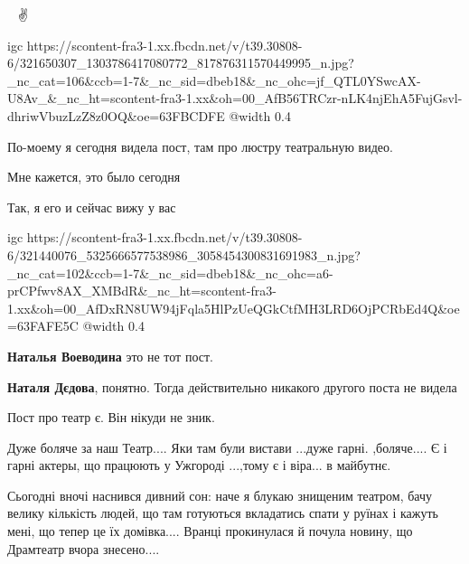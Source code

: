  
 
 
 
 


💖🙌🙏✌

\ifcmt
  igc https://scontent-fra3-1.xx.fbcdn.net/v/t39.30808-6/321650307_1303786417080772_817876311570449995_n.jpg?_nc_cat=106&ccb=1-7&_nc_sid=dbeb18&_nc_ohc=jf_QTL0YSwcAX-U8Av_&_nc_ht=scontent-fra3-1.xx&oh=00_AfB56TRCzr-nLK4njEhA5FujGsvl-dhriwVbuzLzZ8z0OQ&oe=63FBCDFE
  @width 0.4
\fi


По-моему я сегодня видела пост, там про люстру театральную видео.

Мне кажется, это было сегодня


Так, я его и сейчас вижу у вас

\ifcmt
  igc https://scontent-fra3-1.xx.fbcdn.net/v/t39.30808-6/321440076_5325666577538986_3058454300831691983_n.jpg?_nc_cat=102&ccb=1-7&_nc_sid=dbeb18&_nc_ohc=a6-prCPfwv8AX_XMBdR&_nc_ht=scontent-fra3-1.xx&oh=00_AfDxRN8UW94jFqla5HlPzUeQGkCtfMH3LRD6OjPCRbEd4Q&oe=63FAFE5C
  @width 0.4
\fi

\begin{itemize} %
\textbf{Наталья Воеводина} это не тот пост.

\textbf{Наталя Дєдова}, понятно. Тогда действительно никакого другого поста не видела
\end{itemize} %

Пост про театр є. Він нікуди не зник.


Дуже боляче за наш Театр.... Яки там були вистави ...дуже гарні. ,боляче.... Є і
гарні актеры, що працюють у Ужгороді ...,тому є і віра... в майбутнє.


Сьогодні вночі наснився дивний сон: наче я блукаю знищеним театром, бачу велику
кількість людей, що там готуються вкладатись спати у руїнах і кажуть мені, що
тепер це їх домівка.... Вранці прокинулася й почула новину, що Драмтеатр вчора
знесено....

